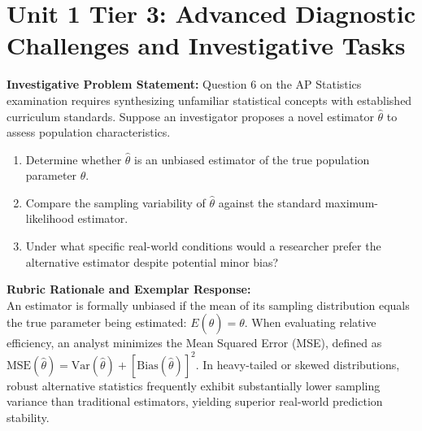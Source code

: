 \section{Unit 1 Tier 3: Advanced Diagnostic Challenges and Investigative Tasks}
\begin{frqrubricbox}
\textbf{Investigative Problem Statement:} Question 6 on the AP Statistics examination requires synthesizing unfamiliar statistical concepts with established curriculum standards. Suppose an investigator proposes a novel estimator $\hat{\theta}$ to assess population characteristics.
\begin{enumerate}[label=(\alph*)]
  \item Determine whether $\hat{\theta}$ is an unbiased estimator of the true population parameter $\theta$.
  \item Compare the sampling variability of $\hat{\theta}$ against the standard maximum-likelihood estimator.
  \item Under what specific real-world conditions would a researcher prefer the alternative estimator despite potential minor bias?
\end{enumerate}
\textbf{Rubric Rationale and Exemplar Response:}\\
An estimator is formally unbiased if the mean of its sampling distribution equals the true parameter being estimated: $E(\hat{\theta}) = \theta$. When evaluating relative efficiency, an analyst minimizes the Mean Squared Error (MSE), defined as $\text{MSE}(\hat{\theta}) = \text{Var}(\hat{\theta}) + [\text{Bias}(\hat{\theta})]^2$. In heavy-tailed or skewed distributions, robust alternative statistics frequently exhibit substantially lower sampling variance than traditional estimators, yielding superior real-world prediction stability.
\end{frqrubricbox}\vspace{6pt}
